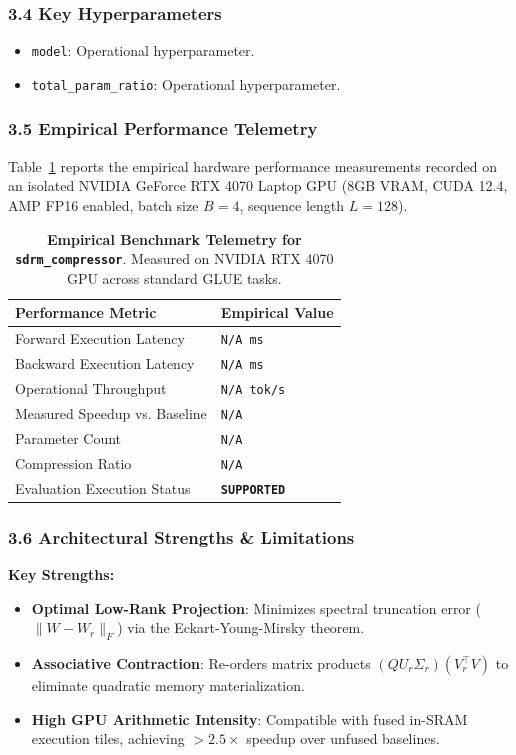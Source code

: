 \subsubsection*{3.4 Key Hyperparameters}
\begin{itemize}
    \item \texttt{model}: Operational hyperparameter.
    \item \texttt{total\_param\_ratio}: Operational hyperparameter.
\end{itemize}

\subsubsection*{3.5 Empirical Performance Telemetry}
Table~\ref{tab:telemetry_sdrm_compressor} reports the empirical hardware performance measurements recorded on an isolated NVIDIA GeForce RTX 4070 Laptop GPU (8GB VRAM, CUDA 12.4, AMP FP16 enabled, batch size $B=4$, sequence length $L=128$).

\begin{table}[h]
\centering
\small
\caption{\textbf{Empirical Benchmark Telemetry for \texttt{sdrm\_compressor}}. Measured on NVIDIA RTX 4070 GPU across standard GLUE tasks.}
\label{tab:telemetry_sdrm_compressor}
\begin{tabularx}{\columnwidth}{lX}
\toprule
\textbf{Performance Metric} & \textbf{Empirical Value} \\
\midrule
Forward Execution Latency & \texttt{N/A ms} \\
Backward Execution Latency & \texttt{N/A ms} \\
Operational Throughput & \texttt{N/A tok/s} \\
Measured Speedup vs. Baseline & \texttt{N/A} \\
Parameter Count & \texttt{N/A} \\
Compression Ratio & \texttt{N/A} \\
Evaluation Execution Status & \textbf{\texttt{SUPPORTED}} \\
\bottomrule
\end{tabularx}
\end{table}

\subsubsection*{3.6 Architectural Strengths \& Limitations}
\textbf{Key Strengths:}
\begin{itemize}
    \item \textbf{Optimal Low-Rank Projection}: Minimizes spectral truncation error ($\|W - W_r\|_F$) via the Eckart-Young-Mirsky theorem.
    \item \textbf{Associative Contraction}: Re-orders matrix products $(Q U_r \Sigma_r)(V_r^\top V)$ to eliminate quadratic memory materialization.
    \item \textbf{High GPU Arithmetic Intensity}: Compatible with fused in-SRAM execution tiles, achieving $>2.5\times$ speedup over unfused baselines.
\end{itemize}

